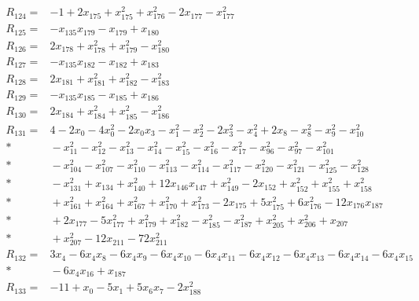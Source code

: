 \begin{align*}
R_{124} ={}& -1 + 2x_{175} + x_{175}^{2} + x_{176}^{2} - 2x_{177} - x_{177}^{2} \\[4pt]
R_{125} ={}& -x_{135}x_{179} - x_{179} + x_{180} \\[4pt]
R_{126} ={}& 2x_{178} + x_{178}^{2} + x_{179}^{2} - x_{180}^{2} \\[4pt]
R_{127} ={}& -x_{135}x_{182} - x_{182} + x_{183} \\[4pt]
R_{128} ={}& 2x_{181} + x_{181}^{2} + x_{182}^{2} - x_{183}^{2} \\[4pt]
R_{129} ={}& -x_{135}x_{185} - x_{185} + x_{186} \\[4pt]
R_{130} ={}& 2x_{184} + x_{184}^{2} + x_{185}^{2} - x_{186}^{2} \\[4pt]
R_{131} ={}& 4 - 2x_{0} - 4x_{0}^{2} - 2x_{0}x_{3} - x_{1}^{2} - x_{2}^{2} - 2x_{3}^{2} - x_{4}^{2} + 2x_{8} - x_{8}^{2} - x_{9}^{2} - x_{10}^{2} \\*
&{} - x_{11}^{2} - x_{12}^{2} - x_{13}^{2} - x_{14}^{2} - x_{15}^{2} - x_{16}^{2} - x_{17}^{2} - x_{96}^{2} - x_{97}^{2} - x_{101}^{2} \\*
&{} - x_{104}^{2} - x_{107}^{2} - x_{110}^{2} - x_{113}^{2} - x_{114}^{2} - x_{117}^{2} - x_{120}^{2} - x_{121}^{2} - x_{125}^{2} - x_{128}^{2} \\*
&{} - x_{131}^{2} + x_{134} + x_{140}^{2} + 12x_{146}x_{147} + x_{149}^{2} - 2x_{152} + x_{152}^{2} + x_{155}^{2} + x_{158}^{2} \\*
&{} + x_{161}^{2} + x_{164}^{2} + x_{167}^{2} + x_{170}^{2} + x_{173}^{2} - 2x_{175} + 5x_{175}^{2} + 6x_{176}^{2} - 12x_{176}x_{187} \\*
&{} + 2x_{177} - 5x_{177}^{2} + x_{179}^{2} + x_{182}^{2} - x_{185}^{2} - x_{187}^{2} + x_{205}^{2} + x_{206}^{2} + x_{207} \\*
&{} + x_{207}^{2} - 12x_{211} - 72x_{211}^{2} \\[4pt]
R_{132} ={}& 3x_{4} - 6x_{4}x_{8} - 6x_{4}x_{9} - 6x_{4}x_{10} - 6x_{4}x_{11} - 6x_{4}x_{12} - 6x_{4}x_{13} - 6x_{4}x_{14} - 6x_{4}x_{15} \\*
&{} - 6x_{4}x_{16} + x_{187} \\[4pt]
R_{133} ={}& -11 + x_{0} - 5x_{1} + 5x_{6}x_{7} - 2x_{188}^{2} \\[4pt]

\end{align*}
